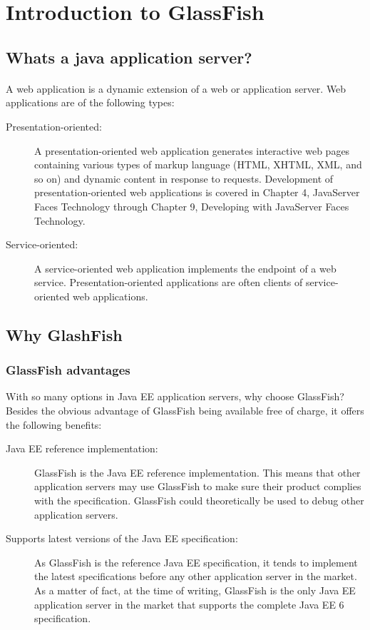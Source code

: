 \section{Introduction to GlassFish}
\subsection{Whats a java application server?}
\paragraph{}
A web application is a dynamic extension of a web or application server. Web applications are of the following types:

\begin{description}
\item[Presentation-oriented:] A presentation-oriented web application generates interactive web pages containing various types of markup language (HTML, XHTML, XML, and so on) and dynamic content in response to requests. Development of presentation-oriented web applications is covered in Chapter 4, JavaServer Faces Technology through Chapter 9, Developing with JavaServer Faces Technology.

\item[Service-oriented:] A service-oriented web application implements the endpoint of a web service. Presentation-oriented applications are often clients of service-oriented web applications. 
\end{description}

\subsection{Why GlashFish}
\subsubsection{GlassFish advantages}
With so many options in Java EE application servers, why choose GlassFish? Besides the obvious advantage of GlassFish being available free of charge, it offers the following benefits:

\begin{description}
\item[Java EE reference implementation:] GlassFish is the Java EE reference implementation. This means that other application servers may use GlassFish to make sure their product complies with the specification. GlassFish could theoretically be used to debug other application servers.

\item[Supports latest versions of the Java EE specification:] As GlassFish is the reference Java EE specification, it tends to implement the latest specifications before any other application server in the market. As a matter of fact, at the time of writing, GlassFish is the only Java EE application server in the market that supports the complete Java EE 6 specification.
\end{description}

